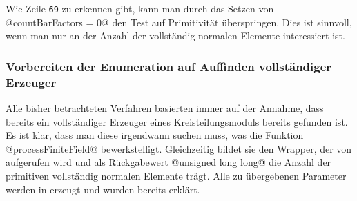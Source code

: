\begin{bemerkung}
  \label{bem:kein_test_auf_primitivitaet}
  Wie Zeile \texttt{69} zu erkennen gibt, kann man durch das Setzen von
  @countBarFactors = 0@ den Test auf Primitivität überspringen. Dies ist
  sinnvoll, wenn man nur an der Anzahl der vollständig normalen Elemente
  interessiert ist.
\end{bemerkung}


\subsubsection{Vorbereiten der Enumeration auf Auffinden vollständiger
  Erzeuger}

Alle bisher betrachteten Verfahren basierten immer auf der Annahme, dass
bereits ein vollständiger Erzeuger eines Kreisteilungsmoduls bereits gefunden
ist. Es ist klar, dass man diese irgendwann suchen muss, was die Funktion
@processFiniteField@ bewerkstelligt. Gleichzeitig bildet sie den Wrapper, der
von \sage aufgerufen wird und als Rückgabewert @unsigned long long@ die Anzahl
der primitiven vollständig normalen Elemente trägt. Alle zu übergebenen
Parameter werden in \sage erzeugt und wurden bereits erklärt.


